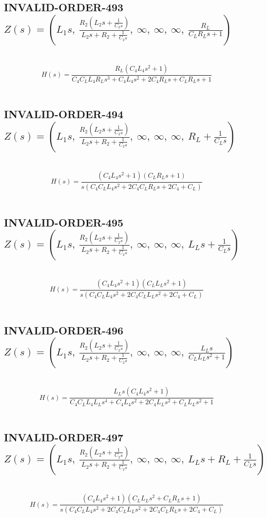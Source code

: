 \documentclass{article}
\begin{document}
\subsection{INVALID-ORDER-493 $Z(s) = \left( L_{1} s, \  \frac{R_{2} \left(L_{2} s + \frac{1}{C_{2} s}\right)}{L_{2} s + R_{2} + \frac{1}{C_{2} s}}, \  \infty, \  \infty, \  \infty, \  \frac{R_{L}}{C_{L} R_{L} s + 1}\right)$ } \ 
\textbf{\[H(s) = \frac{R_{L} \left(C_{4} L_{4} s^{2} + 1\right)}{C_{4} C_{L} L_{4} R_{L} s^{3} + C_{4} L_{4} s^{2} + 2 C_{4} R_{L} s + C_{L} R_{L} s + 1}\] } \ 
\subsection{INVALID-ORDER-494 $Z(s) = \left( L_{1} s, \  \frac{R_{2} \left(L_{2} s + \frac{1}{C_{2} s}\right)}{L_{2} s + R_{2} + \frac{1}{C_{2} s}}, \  \infty, \  \infty, \  \infty, \  R_{L} + \frac{1}{C_{L} s}\right)$ } \ 
\textbf{\[H(s) = \frac{\left(C_{4} L_{4} s^{2} + 1\right) \left(C_{L} R_{L} s + 1\right)}{s \left(C_{4} C_{L} L_{4} s^{2} + 2 C_{4} C_{L} R_{L} s + 2 C_{4} + C_{L}\right)}\] } \ 
\subsection{INVALID-ORDER-495 $Z(s) = \left( L_{1} s, \  \frac{R_{2} \left(L_{2} s + \frac{1}{C_{2} s}\right)}{L_{2} s + R_{2} + \frac{1}{C_{2} s}}, \  \infty, \  \infty, \  \infty, \  L_{L} s + \frac{1}{C_{L} s}\right)$ } \ 
\textbf{\[H(s) = \frac{\left(C_{4} L_{4} s^{2} + 1\right) \left(C_{L} L_{L} s^{2} + 1\right)}{s \left(C_{4} C_{L} L_{4} s^{2} + 2 C_{4} C_{L} L_{L} s^{2} + 2 C_{4} + C_{L}\right)}\] } \ 
\subsection{INVALID-ORDER-496 $Z(s) = \left( L_{1} s, \  \frac{R_{2} \left(L_{2} s + \frac{1}{C_{2} s}\right)}{L_{2} s + R_{2} + \frac{1}{C_{2} s}}, \  \infty, \  \infty, \  \infty, \  \frac{L_{L} s}{C_{L} L_{L} s^{2} + 1}\right)$ } \ 
\textbf{\[H(s) = \frac{L_{L} s \left(C_{4} L_{4} s^{2} + 1\right)}{C_{4} C_{L} L_{4} L_{L} s^{4} + C_{4} L_{4} s^{2} + 2 C_{4} L_{L} s^{2} + C_{L} L_{L} s^{2} + 1}\] } \ 
\subsection{INVALID-ORDER-497 $Z(s) = \left( L_{1} s, \  \frac{R_{2} \left(L_{2} s + \frac{1}{C_{2} s}\right)}{L_{2} s + R_{2} + \frac{1}{C_{2} s}}, \  \infty, \  \infty, \  \infty, \  L_{L} s + R_{L} + \frac{1}{C_{L} s}\right)$ } \ 
\textbf{\[H(s) = \frac{\left(C_{4} L_{4} s^{2} + 1\right) \left(C_{L} L_{L} s^{2} + C_{L} R_{L} s + 1\right)}{s \left(C_{4} C_{L} L_{4} s^{2} + 2 C_{4} C_{L} L_{L} s^{2} + 2 C_{4} C_{L} R_{L} s + 2 C_{4} + C_{L}\right)}\] } \ 
\end{document}
